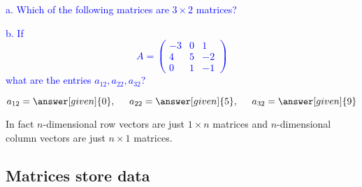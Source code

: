 \documentclass{ximera}
\begin{document}
\begin{question}
\textcolor{blue}{
  a. Which of the following matrices are $3\times 2$ matrices?
  \begin{multipleChoice}
\end{multipleChoice}
  b. If
  \[A= \left(\begin{array}{ccc}
  -3 & 0 & 1\\
  4 & 5 & -2\\
  0 & 1 & -1
  \end{array}\right)\]
  what are the entries $a_{12}, a_{22}, a_{32}$?
  \begin{prompt}
  \begin{equation*}
  a_{12} = \answer[given]{0}, \hspace{.5cm} a_{22} = \answer[given]{5}, \hspace{.5cm} a_{32} = \answer[given]{9}
  \end{equation*}
  \end{prompt}}
\end{question}
In fact $n$-dimensional row vectors are just $1\times n$ matrices and
$n$-dimensional column vectors are just $n\times 1$ matrices.


\subsection{Matrices store data}
\end{document}
